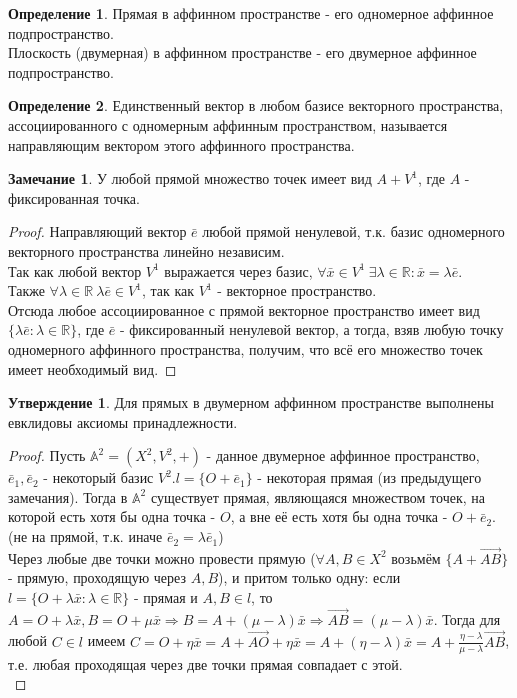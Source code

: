 \documentclass[a4paper, 12pt]{article}
\theoremstyle{definition}
\newtheorem*{definition}{Определение}
\newtheorem*{subtheorem}{Утверждение}
\newtheorem*{remark}{Замечание}
\begin{document}
	\begin{definition}
		Прямая в аффинном пространстве - его одномерное аффинное подпространство. \\Плоскость (двумерная) в аффинном пространстве - его двумерное аффинное подпространство.
	\end{definition}
	\begin{definition}
		Единственный вектор в любом базисе векторного пространства, ассоциированного с одномерным аффинным пространством, называется направляющим вектором этого аффинного пространства.
	\end{definition}
	\begin{remark}
		У любой прямой множество точек имеет вид $A + V^1$, где $A$ - фиксированная точка.
	\end{remark}
	\begin{proof}
		Направляющий вектор $\bar{e}$ любой прямой ненулевой, т.к. базис одномерного векторного пространства линейно независим.\\
		Так как любой вектор $V^1$ выражается через базис, $\forall\bar{x} \in V^1 \ \exists\lambda\in\mathbb{R}: \bar{x} = \lambda\bar{e}$. \\
		Также $\forall\lambda\in\mathbb{R} \ \lambda\bar{e} \in V^1$, так как $V^1$ - векторное пространство. \\
		Отсюда любое ассоциированное с прямой векторное пространство имеет вид $\{\lambda\bar{e}:\lambda \in \mathbb{R}\}$, где $\bar{e}$ - фиксированный ненулевой вектор, а тогда, взяв любую точку одномерного аффинного пространства, получим, что всё его множество точек имеет необходимый вид.
	\end{proof}
	\begin{subtheorem}
		Для прямых в двумерном аффинном пространстве выполнены евклидовы аксиомы принадлежности.
	\end{subtheorem}
	\begin{proof}
		Пусть $\mathbb{A}^2 = (X^2, V^2, +)$ - данное двумерное аффинное пространство, $\bar{e}_{1}, \bar{e}_{2}$ - некоторый базис $V^2. l = \{O + \bar{e}_{1}\}$ - некоторая прямая (из предыдущего замечания). Тогда в $\mathbb{A}^2$ существует прямая, являющаяся множеством точек, на которой есть хотя бы одна точка - $O$, а вне её есть хотя бы одна точка - $O + \bar{e}_{2}$. (не на прямой, т.к. иначе $\bar{e}_{2} = \lambda\bar{e}_{1}$)\\
		Через любые две точки можно провести прямую ($\forall A,B \in X^2$ возьмём $\{A + \overrightarrow{AB}\}$ - прямую, проходящую через $A, B$), и притом только одну: если $l = \{O +\lambda\bar{x}: \lambda \in \mathbb{R}\}$ - прямая и $A,B \in l$, то $A = O + \lambda\bar{x}, B = O + \mu\bar{x} \Rightarrow B = A + (\mu - \lambda)\bar{x} \Rightarrow \overrightarrow{AB} = (\mu - \lambda)\bar{x}$. Тогда для любой $C \in l$ имеем $C = O + \eta\bar{x} = A + \overrightarrow{AO} + \eta\bar{x} = A + (\eta - \lambda)\bar{x} = A + \frac{\eta - \lambda}{\mu - \lambda}\overrightarrow{AB}$, т.е. любая проходящая через две точки прямая совпадает с этой.\\
	\end{proof}
\end{document}
